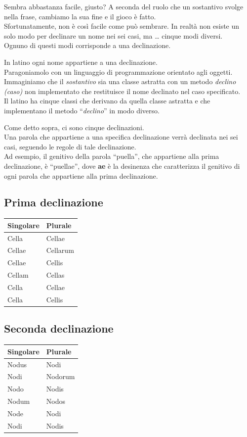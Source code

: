 \documentclass[8pt]{book}
\begin{document}
Sembra abbastanza facile, giusto? A seconda del ruolo che un sostantivo svolge nella frase, cambiamo la sua fine e il gioco è fatto.\\
Sfortunatamente, non è così facile come può sembrare. In realtà non esiste un solo modo per declinare un nome nei sei casi, ma \ldots{} cinque modi diversi.\\
Ognuno di questi modi corrisponde a una declinazione.

In latino ogni nome appartiene a una declinazione.\\
Paragoniamolo con un linguaggio di programmazione orientato agli oggetti.\\
Immaginiamo che il \emph{sostantivo} sia una classe astratta con un metodo \emph{declino (caso)} non implementato che restituisce il nome declinato nel caso specificato.\\
Il latino ha cinque classi che derivano da quella classe astratta e che implementano il metodo ``\emph{declino}'' in modo diverso.

Come detto sopra, ci sono cinque declinazioni.\\
Una parola che appartiene a una specifica declinazione verrà declinata nei sei casi, seguendo le regole di tale declinazione.\\
Ad esempio, il genitivo della parola ``puella'', che appartiene alla prima declinazione, è ``puellae'', dove \textbf{ae} è la desinenza che caratterizza il genitivo di ogni parola che appartiene alla prima declinazione.

\subsection{Prima declinazione}
\begin{longtable}[c]{@{}ll@{}}
\toprule
Singolare & Plurale\tabularnewline
\midrule
\endhead
Cella & Cellae\tabularnewline
Cellae & Cellarum\tabularnewline
Cellae & Cellis\tabularnewline
Cellam & Cellas\tabularnewline
Cella & Cellae\tabularnewline
Cella & Cellis\tabularnewline
\bottomrule
\end{longtable}

\subsection{Seconda declinazione}
\begin{longtable}[c]{@{}ll@{}}
\toprule
Singolare & Plurale\tabularnewline
\midrule
\endhead
Nodus & Nodi\tabularnewline
Nodi & Nodorum\tabularnewline
Nodo & Nodis\tabularnewline
Nodum & Nodos\tabularnewline
Node & Nodi\tabularnewline
Nodi & Nodis\tabularnewline
\bottomrule
\end{longtable}
\end{document}
